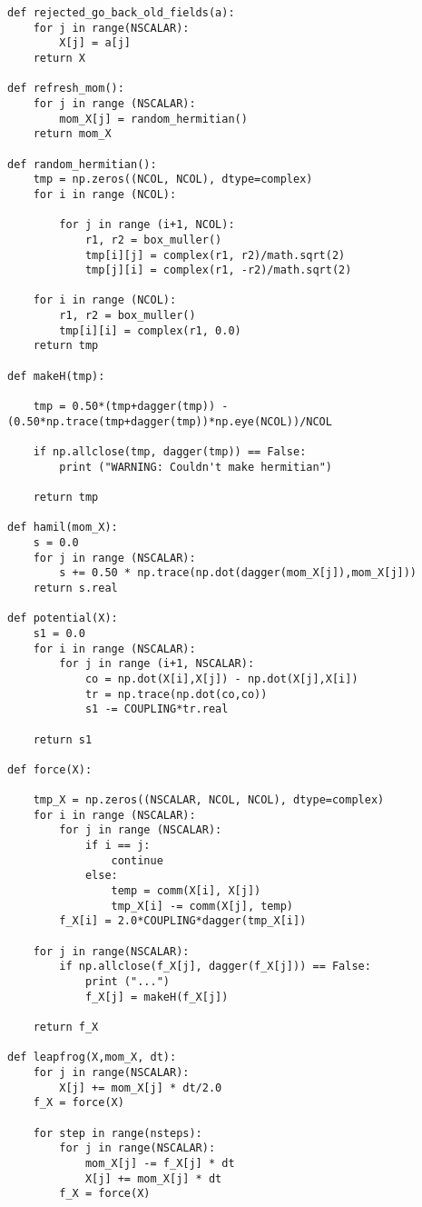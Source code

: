 \begin{lstlisting}
def rejected_go_back_old_fields(a):
    for j in range(NSCALAR):
        X[j] = a[j]
    return X

def refresh_mom():
    for j in range (NSCALAR):
        mom_X[j] = random_hermitian()
    return mom_X

def random_hermitian():
    tmp = np.zeros((NCOL, NCOL), dtype=complex)
    for i in range (NCOL):

        for j in range (i+1, NCOL):
            r1, r2 = box_muller()
            tmp[i][j] = complex(r1, r2)/math.sqrt(2)
            tmp[j][i] = complex(r1, -r2)/math.sqrt(2)

    for i in range (NCOL):
        r1, r2 = box_muller()
        tmp[i][i] = complex(r1, 0.0)
    return tmp 

def makeH(tmp):

    tmp = 0.50*(tmp+dagger(tmp)) - (0.50*np.trace(tmp+dagger(tmp))*np.eye(NCOL))/NCOL

    if np.allclose(tmp, dagger(tmp)) == False:
        print ("WARNING: Couldn't make hermitian")

    return tmp

def hamil(mom_X):
    s = 0.0 
    for j in range (NSCALAR):
        s += 0.50 * np.trace(np.dot(dagger(mom_X[j]),mom_X[j]))
    return s.real    

def potential(X):
    s1 = 0.0 
    for i in range (NSCALAR):
        for j in range (i+1, NSCALAR): 
            co = np.dot(X[i],X[j]) - np.dot(X[j],X[i])
            tr = np.trace(np.dot(co,co))
            s1 -= COUPLING*tr.real 

    return s1

def force(X):

    tmp_X = np.zeros((NSCALAR, NCOL, NCOL), dtype=complex)
    for i in range (NSCALAR): 
        for j in range (NSCALAR):
            if i == j:
                continue 
            else:
                temp = comm(X[i], X[j])
                tmp_X[i] -= comm(X[j], temp)
        f_X[i] = 2.0*COUPLING*dagger(tmp_X[i])

    for j in range(NSCALAR):
        if np.allclose(f_X[j], dagger(f_X[j])) == False:
            print ("...")
            f_X[j] = makeH(f_X[j])

    return f_X  

def leapfrog(X,mom_X, dt):
    for j in range(NSCALAR):
        X[j] += mom_X[j] * dt/2.0
    f_X = force(X)

    for step in range(nsteps):
        for j in range(NSCALAR):
            mom_X[j] -= f_X[j] * dt
            X[j] += mom_X[j] * dt
        f_X = force(X)


\end{lstlisting}
